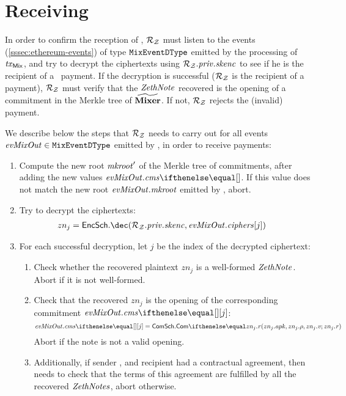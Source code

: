 
\section{Receiving \zethnotes}\label{zeth-protocol:zeth-receive}

In order to confirm the reception of \zethnotes, $\mathcal{{R}_{Z}}$ must listen to the events (\cref{sssec:ethereum-events}) of type ${\mathtt{MixEventDType}}$ emitted by the processing of $\mathit{\mathit{tx}_{\mathsf{Mix}}}$, and try to decrypt the ciphertexts using $\mathcal{{R}_{Z}}.\mathit{priv}.\mathit{skenc}$ to see if he is the recipient of a \zeth~payment. If the decryption is successful ($\mathcal{{R}_{Z}}$ is the recipient of a payment), $\mathcal{{R}_{Z}}$ must verify that the $\mathit{ZethNote}$ recovered is the opening of a commitment in the Merkle tree of $\widetilde{\mathbf{Mixer}}$. If not, $\mathcal{{R}_{Z}}$ rejects the (invalid) payment.

We describe below the steps that $\mathcal{{R}_{Z}}$ needs to carry out for all events $\mathit{evMixOut}{} \in {\mathtt{MixEventDType}}$ emitted by \mixer{}, in order to receive payments:

\begin{enumerate}
    \item\label{zeth-receive:check-commit-tree} Compute the new root $\mathit{mkroot}'$ of the Merkle tree of commitments, after adding the new values $\evMixOut.\cms{}$. If this value does not match the new root $\mathit{evMixOut}.\mathit{mkroot}$ emitted by \mixer{}, abort.
    \item\label{zeth-receive:decrypt} Try to decrypt the ciphertexts:
        \begin{align*}
            & zn_j = \encscheme.\dec(\zparty{R}.\privaddr.\skenc, \evMixOut.\ciphers[j])
        \end{align*}
    \item For each successful decryption, let $j$ be the index of the decrypted ciphertext:
        \begin{enumerate}
            \item\label{zeth-receive:parse-plaintext} Check whether the recovered plaintext $zn_j$ is a well-formed $\mathit{ZethNote}$. Abort if it is not well-formed.
            \item\label{zeth-receive:check-note-data} Check that the recovered \zethnote $zn_j$ is the opening of the corresponding commitment $\evMixOut{}.\cms{}[j]$:
                \[
                    \evMixOut.\cms{}[j] = \comm.\commit{zn_j.\apk, zn_j.\rrho, zn_j.\notev}{zn_j.\noter}
                \]
              Abort if the note is not a valid opening.
            \item Additionally, if sender , and recipient  had a contractual agreement, then  needs to check that the terms of this agreement are fulfilled by all the recovered $\mathit{ZethNotes}$, abort otherwise.
        \end{enumerate}
\end{enumerate}


